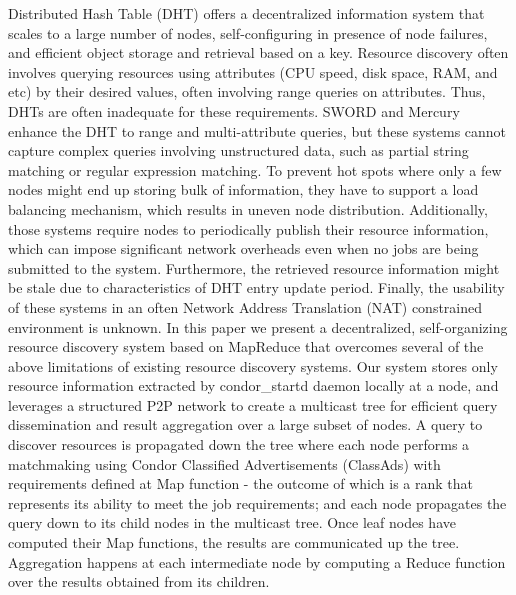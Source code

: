 \documentclass{acm_proc_article-sp}
\begin{document}
Distributed Hash Table (DHT)\cite{chord}\cite{pastry} offers a decentralized information system that scales to a large number of nodes, self-configuring in presence of node failures, and efficient object storage and retrieval based on a key. 
Resource discovery often involves querying resources using attributes (CPU speed, disk space, RAM, and etc) by their desired values, often involving range queries on attributes. 
Thus, DHTs are often inadequate for these requirements. 
SWORD\cite{sword} and Mercury\cite{mercury} enhance the DHT to range and multi-attribute queries, but these systems cannot capture complex queries involving unstructured data, such as partial string matching or regular expression matching. 
To prevent hot spots where only a few nodes might end up storing bulk of information, they have to support a load balancing mechanism, which results in uneven node distribution.
Additionally, those systems require nodes to periodically publish their resource information, which can impose significant network overheads even when no jobs are being submitted to the system. 
Furthermore, the retrieved resource information might be stale due to characteristics of DHT entry update period. 
Finally, the usability of these systems in an often Network Address Translation (NAT) constrained environment is unknown. 
In this paper we present a decentralized, self-organizing resource discovery system based on MapReduce that overcomes several of the above limitations of existing resource discovery systems. 
Our system stores only resource information extracted by condor\_startd daemon\cite{condor} locally at a node, 
and leverages a structured P2P network to create a multicast tree for efficient query dissemination and result aggregation over a large subset of nodes. 
A query to discover resources is propagated down the tree where each node performs a matchmaking using Condor Classified Advertisements (ClassAds)\cite{classad} with requirements defined at Map function - the outcome of which is a rank that represents its ability to meet the job requirements; 
and each node propagates the query down to its child nodes in the multicast tree. 
Once leaf nodes have computed their Map functions, the results are communicated up the tree. 
Aggregation happens at each intermediate node by computing a Reduce function over the results obtained from its children. 
\end{document}
